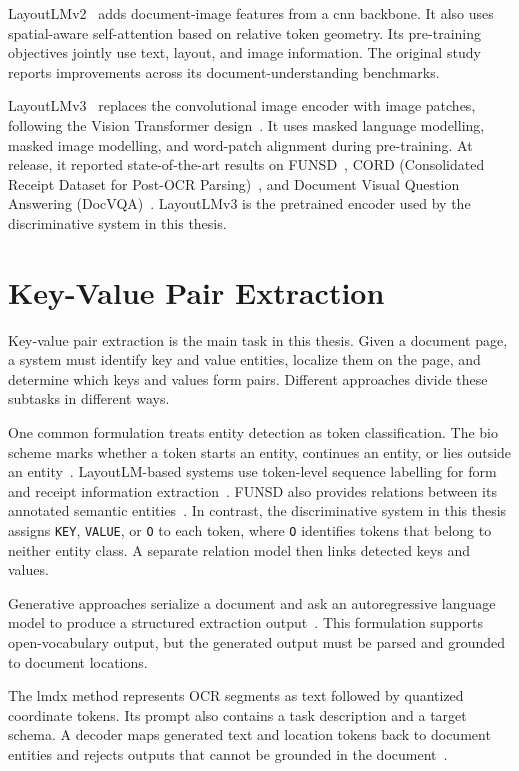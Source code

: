 LayoutLMv2~\cite{layoutlmv2} adds document-image features from a \gls{cnn}
backbone. It also uses spatial-aware self-attention based on relative token
geometry. Its pre-training objectives jointly use text, layout, and image
information. The original study reports improvements across its
document-understanding benchmarks.

LayoutLMv3~\cite{layoutlmv3} replaces the convolutional image encoder with
image patches, following the Vision Transformer design~\cite{vit}. It uses
masked language modelling, masked image modelling, and word-patch alignment
during pre-training. At release, it reported state-of-the-art results on
FUNSD~\cite{funsd}, CORD (Consolidated Receipt Dataset for Post-OCR
Parsing)~\cite{cord}, and Document Visual Question Answering
(DocVQA)~\cite{docvqa}. LayoutLMv3 is the pretrained encoder used by the
discriminative system in this thesis.

\section{Key-Value Pair Extraction}
\label{sec:kvp_extraction}

Key-value pair extraction is the main task in this thesis. Given a document
page, a system must identify key and value entities, localize them on the page,
and determine which keys and values form pairs. Different approaches divide
these subtasks in different ways.

One common formulation treats entity detection as token classification. The
\gls{bio} scheme marks whether a token starts an entity, continues an entity,
or lies outside an entity~\cite{ramshaw1995text}. LayoutLM-based systems use
token-level sequence labelling for form and receipt information
extraction~\cite{layoutlm,layoutlmv2,layoutlmv3}. FUNSD also provides relations
between its annotated semantic entities~\cite{funsd}. In contrast, the
discriminative system in this thesis assigns \texttt{KEY}, \texttt{VALUE}, or
\texttt{O} to each token, where \texttt{O} identifies tokens that belong to
neither entity class. A separate relation model then links detected keys and
values.

Generative approaches serialize a document and ask an autoregressive language
model to produce a structured extraction output~\cite{seq2seq,lmdx,kvp10k}.
This formulation supports open-vocabulary output, but the generated output must
be parsed and grounded to document locations.

The \gls{lmdx} method represents OCR segments as text followed by quantized
coordinate tokens. Its prompt also contains a task description and a target
schema. A decoder maps generated text and location tokens back to document
entities and rejects outputs that cannot be grounded in the
document~\cite{lmdx}.

